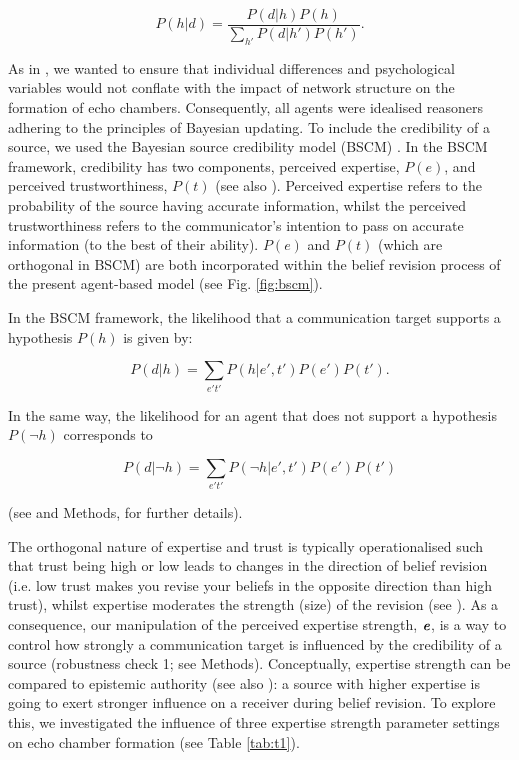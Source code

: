 \documentclass[fleqn,10pt]{wlscirep}
\begin{document}
\begin{equation}
    P(h|d) = \frac{P(d|h)P(h)}{\sum_{h'}P(d|h')P(h')}.
\end{equation}

As in \cite{madsen2017growing, madsen2018large}, we wanted to ensure that individual differences and psychological variables would not conflate with the impact of network structure on the formation of echo chambers. Consequently, all agents were idealised reasoners adhering to the principles of Bayesian updating. To include the credibility of a source, we used the Bayesian source credibility model (BSCM) \cite{bovens2003bayesian, hahn2009argument, harris2009bayesian}. In the BSCM framework, credibility has two components, perceived expertise, \(P(e)\), and perceived trustworthiness, \(P(t)\) (see also \cite{harris2016appeal}). Perceived expertise refers to the probability of the source having accurate information, whilst the perceived trustworthiness refers to the communicator's intention to pass on accurate information (to the best of their ability). \(P(e)\) and \(P(t)\) (which are orthogonal in BSCM) are both incorporated within the belief revision process of the present agent-based model (see Fig. \ref{fig:bscm}).

In the BSCM framework, the likelihood that a communication target supports a hypothesis \(P(h)\) is given by:  

\begin{equation}
    P(d|h) = \sum_{e't'}P(h|e',t')P(e')P(t'). 
\end{equation}

In the same way, the likelihood for an agent that does not support a hypothesis \(P(\neg h)\) corresponds to
   
\begin{equation}
    P(d|\neg h) = \sum_{e't'}P(\neg h|e',t')P(e')P(t') 
\end{equation}

(see \cite{hahn2009argument, harris2016appeal} and Methods, for further details).  

The orthogonal nature of expertise and trust is typically operationalised such that trust being high or low leads to changes in the direction of belief revision (i.e. low trust makes you revise your beliefs in the opposite direction than high trust), whilst expertise moderates the strength (size) of the revision (see  \cite{bovens2003bayesian, harris2016appeal}). As a consequence, our manipulation of the perceived expertise strength, \(\textbf{\emph{e}}\), is a way to control how strongly a communication target is influenced by the credibility of a source (robustness check 1; see Methods). Conceptually, expertise strength can be compared to epistemic authority (see also \cite{walton2010appeal}): a source with higher expertise is going to exert stronger influence on a receiver during belief revision. To explore this, we investigated the influence of three expertise strength parameter settings on echo chamber formation (see Table \ref{tab:t1}). 
\end{document}
